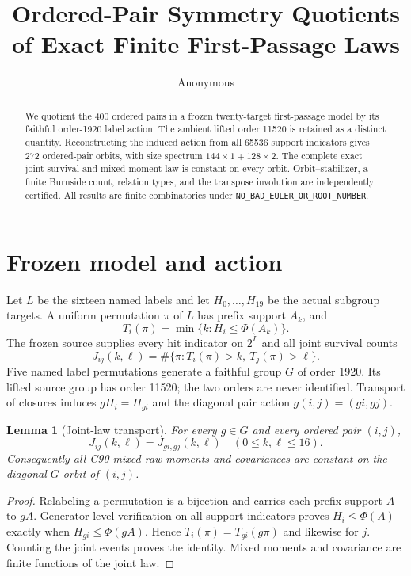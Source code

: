 \documentclass[10pt]{article}
\title{Ordered-Pair Symmetry Quotients of Exact Finite First-Passage Laws}
\author{Anonymous}
\date{}
\newtheorem{lemma}{Lemma}
\begin{document}
\maketitle

\begin{abstract}
We quotient the 400 ordered pairs in a frozen twenty-target first-passage
model by its faithful order-1920 label action.  The ambient lifted order 11520
is retained as a distinct quantity.  Reconstructing the induced action from
all 65536 support indicators gives 272 ordered-pair orbits, with size spectrum
$144\times1+128\times2$.  The complete exact joint-survival and mixed-moment
law is constant on every orbit.  Orbit--stabilizer, a finite Burnside count,
relation types, and the transpose involution are independently certified.
All results are finite combinatorics under
\texttt{NO\_BAD\_EULER\_OR\_ROOT\_NUMBER}.
\end{abstract}

\section{Frozen model and action}
Let $L$ be the sixteen named labels and let $H_0,\ldots,H_{19}$ be the actual
subgroup targets.  A uniform permutation $\pi$ of $L$ has prefix support
$A_k$, and
\[
 T_i(\pi)=\min\{k:H_i\leq\Phi(A_k)\}.
\]
The frozen source supplies every hit indicator on $2^L$ and all joint
survival counts
\[
 J_{ij}(k,\ell)=\#\{\pi:T_i(\pi)>k,\ T_j(\pi)>\ell\}.
\]
Five named label permutations generate a faithful group $G$ of order 1920.
Its lifted source group has order 11520; the two orders are never identified.
Transport of closures induces $gH_i=H_{g i}$ and the diagonal pair action
$g(i,j)=(g i,g j)$.

\begin{lemma}[Joint-law transport]
For every $g\in G$ and every ordered pair $(i,j)$,
\[
 J_{ij}(k,\ell)=J_{g i,g j}(k,\ell)
 \quad(0\leq k,\ell\leq16).
\]
Consequently all C90 mixed raw moments and covariances are constant on the
diagonal $G$-orbit of $(i,j)$.
\end{lemma}
\begin{proof}
Relabeling a permutation is a bijection and carries each prefix support $A$
to $gA$.  Generator-level verification on all support indicators proves
$H_i\leq\Phi(A)$ exactly when $H_{g i}\leq\Phi(gA)$.  Hence
$T_i(\pi)=T_{g i}(g\pi)$ and likewise for $j$.  Counting the joint events
proves the identity.  Mixed moments and covariance are finite functions of
the joint law.
\end{proof}
\end{document}
